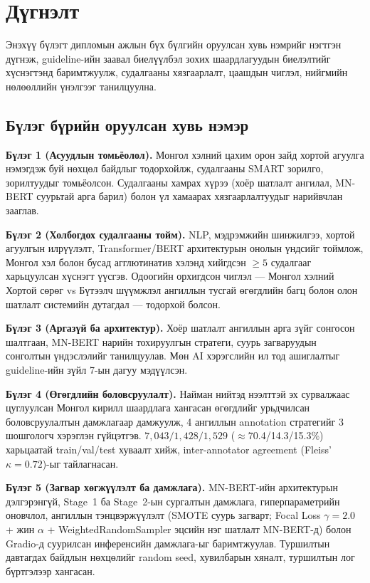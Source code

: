 ﻿%

\chapter{Дүгнэлт}
\label{Chapter8}

Энэхүү бүлэгт дипломын ажлын бүх бүлгийн оруулсан хувь нэмрийг нэгтгэн дүгнэж,
guideline-ийн заавал биелүүлбэл зохих шаардлагуудын биелэлтийг хүснэгтэнд
баримтжуулж, судалгааны хязгаарлалт, цаашдын чиглэл, нийгмийн нөлөөллийн
үнэлгээг танилцуулна.

\section{Бүлэг бүрийн оруулсан хувь нэмэр}

\textbf{Бүлэг 1 (Асуудлын томьёолол).} Монгол хэлний цахим орон зайд хортой
агуулга нэмэгдэж буй нөхцөл байдлыг тодорхойлж, судалгааны SMART зорилго,
зорилтуудыг томьёолсон. Судалгааны хамрах хүрээ (хоёр шатлалт ангилал, MN-BERT
суурьтай арга барил) болон үл хамаарах хязгаарлалтуудыг нарийвчлан зааглав.

\textbf{Бүлэг 2 (Холбогдох судалгааны тойм).} NLP, мэдрэмжийн шинжилгээ, хортой
агуулгын илрүүлэлт, Transformer/BERT архитектурын онолын үндсийг тоймлож,
Монгол хэл болон бусад агглютинатив хэлэнд хийгдсэн $\geq\!5$ судалгааг
харьцуулсан хүснэгт үүсгэв. Одоогийн орхигдсон чиглэл --- Монгол хэлний
Хортой сөрөг vs Бүтээлч шүүмжлэл ангиллын тусгай өгөгдлийн багц болон олон шатлалт системийн
дутагдал --- тодорхой болсон.

\textbf{Бүлэг 3 (Аргазүй ба архитектур).} Хоёр шатлалт ангиллын арга зүйг
сонгосон шалтгаан, MN-BERT нарийн тохируулгын стратеги, суурь загваруудын сонголтын
үндэслэлийг танилцуулав. Мөн AI хэрэгслийн ил тод ашиглалтыг guideline-ийн
зүйл 7-ын дагуу мэдүүлсэн.

\textbf{Бүлэг 4 (Өгөгдлийн боловсруулалт).} Найман нийтэд нээлттэй эх сурвалжаас
цуглуулсан Монгол кирилл шаардлага хангасан өгөгдлийг урьдчилсан боловсруулалтын
дамжлагаар дамжуулж, 4 ангиллын annotation стратегийг 3 шошгологч хэрэглэн
гүйцэтгэв. $7{,}043/1{,}428/1{,}529$ ($\approx$70.4/14.3/15.3\%) харьцаатай
train/val/test хуваалт хийж, inter-annotator agreement (Fleiss' $\kappa=0.72$)-ыг
тайлагнасан.

\textbf{Бүлэг 5 (Загвар хөгжүүлэлт ба дамжлага).} MN-BERT-ийн архитектурын
дэлгэрэнгүй, Stage~1 ба Stage~2-ын сургалтын дамжлага, гиперпараметрийн оновчлол,
ангиллын тэнцвэржүүлэлт (SMOTE суурь загварт; Focal Loss $\gamma{=}2.0$ + жин
$\alpha$ + WeightedRandomSampler эцсийн нэг шатлалт MN-BERT-д) болон Gradio-д
суурилсан инференсийн дамжлага-ыг баримтжуулав. Туршилтын давтагдах байдлын нөхцөлийг
random seed, хувилбарын хяналт, туршилтын лог бүртгэлээр хангасан.

